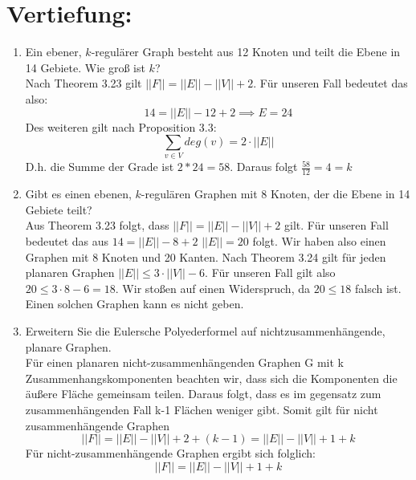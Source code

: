 


\usepackage{wrapfig}
\usepackage{graphicx}
\usepackage{color}


    \maketitle
    \section*{Vertiefung:}
    \begin{enumerate}[label=(\alph*)]
        \item  Ein ebener, $k$-regulärer Graph besteht aus 12 Knoten und teilt die Ebene in 14 Gebiete. 
        Wie groß ist $k$? \\
        Nach Theorem 3.23 gilt $||F|| = ||E|| - ||V|| + 2$. Für unseren Fall bedeutet das also:
        $$14 = ||E|| - 12 + 2 \implies E = 24$$ Des weiteren gilt nach Proposition 3.3:
        $$\sum_{v \in V} deg(v) = 2 \cdot ||E||$$ D.h. die Summe der Grade ist $2 * 24 = 58$.
        Daraus folgt $\frac{58}{12} = 4 = k$
        
        \item Gibt es einen ebenen, $k$-regulären Graphen mit 8 Knoten, der die Ebene in 14 Gebiete
        teilt? \\  
        Aus Theorem 3.23 folgt, dass $||F|| = ||E|| - ||V|| + 2$ gilt. Für unseren Fall bedeutet 
        das aus $ 14 = ||E|| - 8 + 2 $ $ ||E|| = 20 $ folgt. Wir haben also einen Graphen mit 8 Knoten 
        und 20 Kanten. Nach Theorem 3.24 gilt für jeden planaren Graphen $ ||E|| \leq 3 \cdot ||V|| - 6$. 
        Für unseren Fall gilt also $20 \leq 3 \cdot 8 - 6  = 18$.
        Wir stoßen auf einen Widerspruch, da $20 \leq 18$ falsch ist. Einen solchen Graphen kann es nicht geben.
        
        \item Erweitern Sie die Eulersche Polyederformel auf nichtzusammenhängende, planare Graphen. \\
        Für einen planaren nicht-zusammenhängenden Graphen G mit k Zusammenhangskomponenten beachten 
        wir, dass sich die Komponenten die äußere Fläche gemeinsam teilen. Daraus folgt, dass es im gegensatz 
        zum zusammenhängenden Fall k-1 Flächen weniger gibt. Somit gilt für nicht zusammenhängende Graphen 
        $$||F|| = ||E|| - ||V|| + 2 + (k-1) = ||E|| - ||V|| + 1 + k$$ Für nicht-zusammenhängende Graphen 
        ergibt sich folglich: $$||F|| = ||E|| - ||V|| + 1 + k $$
       

\end{enumerate}
